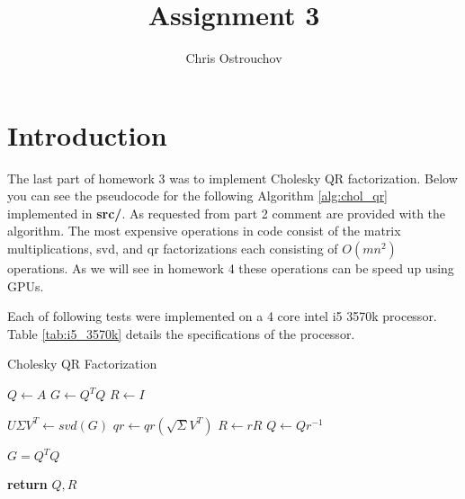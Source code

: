 \documentclass[11pt]{article}
\begin{document}
\title{Assignment 3}
\author{Chris Ostrouchov}
\date{}
\maketitle

\section{Introduction}

The last part of homework 3 was to implement Cholesky QR factorization. Below you can see the pseudocode for the following Algorithm \ref{alg:chol_qr} implemented in \textbf{src/}. As requested from part 2 comment are provided with the algorithm. The most expensive operations in code consist of the matrix multiplications, svd, and qr factorizations each consisting of $O(mn^{2})$ operations. As we will see in homework 4 these operations can be speed up using GPUs. 

Each of following tests were implemented on a 4 core intel i5 3570k processor. Table \ref{tab:i5_3570k} details the specifications of the processor. 

\begin{algorithm}
  \caption{Cholesky QR Factorization}
  \label{alg:chol_qr}
  \begin{algorithmic}[1]
    
    \State $Q \gets A$
    \State $G \gets Q^{T}Q$ 
    \State $R \gets I$

      \State $U \Sigma V^{T} \gets svd(G)$  
      \State $q r \gets qr(\sqrt{\Sigma}V^{T})$ 
      \State $R \gets r R$ 
      \State $Q \gets Q r^{-1}$ 

        \State $G = Q^{T} Q $
      \EndIf
    \EndWhile

    \State \textbf{return} $Q, R$

    \EndProcedure
  \end{algorithmic}
\end{algorithm}
\end{document}
